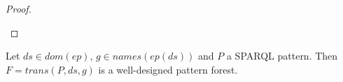 \begin{proof}
\begin{enumerate}

	\end{enumerate}
\end{proof}


\begin{lemma}
	Let $ds \in dom(ep)$, $g \in names(ep(ds))$ and $P$ a SPARQL pattern.
	Then $F = trans(P,ds,g)$ is a well-designed pattern forest.
\end{lemma}

